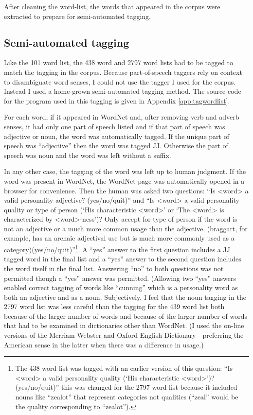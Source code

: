 \documentclass[eric_thesis.tex]{subfiles}
\begin{document}
After cleaning the word-list, the words that appeared in the corpus were 
extracted to prepare for semi-automated tagging.

\subsection{Semi-automated tagging}

Like the 101 word list, the 438 word and 2797 word lists had to be tagged to 
match the tagging in the corpus. Because part-of-speech taggers rely on context 
to disambiguate word senses, I could not use the tagger I used for the 
corpus. Instead I used a home-grown semi-automated tagging method. The source 
code for the program used in this tagging is given in 
Appendix \ref{app:tagwordlist}. 

For each word, if it appeared in WordNet \citep{PrincetonUniversity2010} and, 
after removing verb and adverb senses, it had only one part of speech listed and 
if that part of speech was adjective or noun, the word was automatically tagged. 
If the unique part of speech was ``adjective'' then the word was tagged JJ. 
Otherwise the part of speech was noun and the word was left without a suffix.

In any other case, the tagging of the word was left up to human judgment. If the
word was present in WordNet, the WordNet page was automatically opened in a 
browser for convenience. Then the human was asked two questions:
``Is <word> a valid personality adjective? (yes/no/quit)'' and ``Is <word> a 
valid personality quality or type of person (`His characteristic <word>' or 
`The <word> is characterized by <word>-ness')? Only accept for type of person 
if the word is not an adjective or a much more common usage than the adjective. 
(braggart, for example, has an archaic adjectival use but is much more commonly 
used as a category)(yes/no/quit)''\footnote{The 438 word list was tagged with an
earlier version of this question: ``Is <word> a valid personality quality 
(`His characteristic <word>')? (yes/no/quit)'' this was changed for the 2797 
word list because it included nouns like ``zealot'' that represent categories
not qualities (``zeal'' would be the quality corresponding to ``zealot'').}. A 
``yes'' answer to the first question includes a JJ tagged word in the final list
and a ``yes'' answer to the second question includes the word itself in the
final list. Answering ``no'' to both questions was not permitted though a 
``yes'' answer was permitted. (Allowing two ``yes'' answers enabled correct 
tagging of words like ``cunning'' which is a personality word as both an 
adjective and as a noun. Subjectively, I feel that the noun tagging in the 2797
word list was less careful than the tagging for the 439 word list both because
of the larger number of words and because of the larger number of words that
had to be examined in dictionaries other than WordNet. (I used the on-line
versions of the Merriam Webster and Oxford English Dictionary - preferring the
American sense in the latter when there was a difference in usage.)
\end{document}
